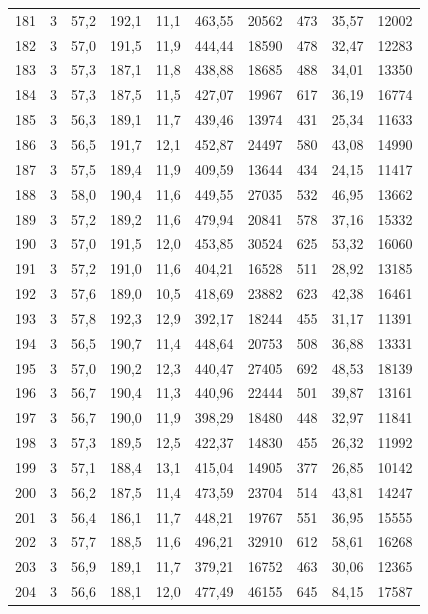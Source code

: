 \documentclass[11pt,a4paper]{article}
\begin{document}
{\begin{longtable}{r c r r r r r r r r}
181 & 3 & 57,2 & 192,1 & 11,1 & 463,55 & 20562 & 473 & 35,57 & 12002 \\
182 & 3 & 57,0 & 191,5 & 11,9 & 444,44 & 18590 & 478 & 32,47 & 12283 \\
183 & 3 & 57,3 & 187,1 & 11,8 & 438,88 & 18685 & 488 & 34,01 & 13350 \\
184 & 3 & 57,3 & 187,5 & 11,5 & 427,07 & 19967 & 617 & 36,19 & 16774 \\
185 & 3 & 56,3 & 189,1 & 11,7 & 439,46 & 13974 & 431 & 25,34 & 11633 \\
186 & 3 & 56,5 & 191,7 & 12,1 & 452,87 & 24497 & 580 & 43,08 & 14990 \\
187 & 3 & 57,5 & 189,4 & 11,9 & 409,59 & 13644 & 434 & 24,15 & 11417 \\
188 & 3 & 58,0 & 190,4 & 11,6 & 449,55 & 27035 & 532 & 46,95 & 13662 \\
189 & 3 & 57,2 & 189,2 & 11,6 & 479,94 & 20841 & 578 & 37,16 & 15332 \\
190 & 3 & 57,0 & 191,5 & 12,0 & 453,85 & 30524 & 625 & 53,32 & 16060 \\
191 & 3 & 57,2 & 191,0 & 11,6 & 404,21 & 16528 & 511 & 28,92 & 13185 \\
192 & 3 & 57,6 & 189,0 & 10,5 & 418,69 & 23882 & 623 & 42,38 & 16461 \\
193 & 3 & 57,8 & 192,3 & 12,9 & 392,17 & 18244 & 455 & 31,17 & 11391 \\
194 & 3 & 56,5 & 190,7 & 11,4 & 448,64 & 20753 & 508 & 36,88 & 13331 \\
195 & 3 & 57,0 & 190,2 & 12,3 & 440,47 & 27405 & 692 & 48,53 & 18139 \\
196 & 3 & 56,7 & 190,4 & 11,3 & 440,96 & 22444 & 501 & 39,87 & 13161 \\
197 & 3 & 56,7 & 190,0 & 11,9 & 398,29 & 18480 & 448 & 32,97 & 11841 \\
198 & 3 & 57,3 & 189,5 & 12,5 & 422,37 & 14830 & 455 & 26,32 & 11992 \\
199 & 3 & 57,1 & 188,4 & 13,1 & 415,04 & 14905 & 377 & 26,85 & 10142 \\
200 & 3 & 56,2 & 187,5 & 11,4 & 473,59 & 23704 & 514 & 43,81 & 14247 \\
201 & 3 & 56,4 & 186,1 & 11,7 & 448,21 & 19767 & 551 & 36,95 & 15555 \\
202 & 3 & 57,7 & 188,5 & 11,6 & 496,21 & 32910 & 612 & 58,61 & 16268 \\
203 & 3 & 56,9 & 189,1 & 11,7 & 379,21 & 16752 & 463 & 30,06 & 12365 \\
204 & 3 & 56,6 & 188,1 & 12,0 & 477,49 & 46155 & 645 & 84,15 & 17587 \\

\end{longtable}}
\end{document}
